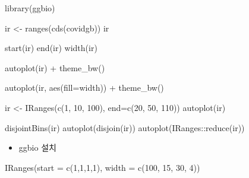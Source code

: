 \documentclass[
]{book}
\newenvironment{Shaded}{\begin{snugshade}}{\end{snugshade}}
\newcommand{\AttributeTok}[1]{\textcolor[rgb]{0.77,0.63,0.00}{#1}}
\newcommand{\DecValTok}[1]{\textcolor[rgb]{0.00,0.00,0.81}{#1}}
\newcommand{\FunctionTok}[1]{\textcolor[rgb]{0.00,0.00,0.00}{#1}}
\newcommand{\NormalTok}[1]{#1}
\newcommand{\OtherTok}[1]{\textcolor[rgb]{0.56,0.35,0.01}{#1}}
\newcommand{\SpecialCharTok}[1]{\textcolor[rgb]{0.00,0.00,0.00}{#1}}
\providecommand{\tightlist}{%
  \setlength{\itemsep}{0pt}\setlength{\parskip}{0pt}}
\begin{document}
\begin{Shaded}
\begin{Highlighting}[]
\FunctionTok{library}\NormalTok{(ggbio)}

\NormalTok{ir }\OtherTok{\textless{}{-}} \FunctionTok{ranges}\NormalTok{(}\FunctionTok{cds}\NormalTok{(covidgb))}
\NormalTok{ir}

\FunctionTok{start}\NormalTok{(ir)}
\FunctionTok{end}\NormalTok{(ir)}
\FunctionTok{width}\NormalTok{(ir)}

\FunctionTok{autoplot}\NormalTok{(ir) }\SpecialCharTok{+}
  \FunctionTok{theme\_bw}\NormalTok{()}

\FunctionTok{autoplot}\NormalTok{(ir, }\FunctionTok{aes}\NormalTok{(}\AttributeTok{fill=}\NormalTok{width)) }\SpecialCharTok{+}
  \FunctionTok{theme\_bw}\NormalTok{()}




\NormalTok{ir }\OtherTok{\textless{}{-}} \FunctionTok{IRanges}\NormalTok{(}\FunctionTok{c}\NormalTok{(}\DecValTok{1}\NormalTok{, }\DecValTok{10}\NormalTok{, }\DecValTok{100}\NormalTok{), }\AttributeTok{end=}\FunctionTok{c}\NormalTok{(}\DecValTok{20}\NormalTok{, }\DecValTok{50}\NormalTok{, }\DecValTok{110}\NormalTok{))}
\FunctionTok{autoplot}\NormalTok{(ir)}


\FunctionTok{disjointBins}\NormalTok{(ir)}
\FunctionTok{autoplot}\NormalTok{(}\FunctionTok{disjoin}\NormalTok{(ir))}
\FunctionTok{autoplot}\NormalTok{(IRanges}\SpecialCharTok{::}\FunctionTok{reduce}\NormalTok{(ir))}
\end{Highlighting}
\end{Shaded}

\begin{itemize}
\tightlist
\item
  ggbio 설치
\end{itemize}

\begin{Shaded}
\begin{Highlighting}[]

\FunctionTok{IRanges}\NormalTok{(}\AttributeTok{start =} \FunctionTok{c}\NormalTok{(}\DecValTok{1}\NormalTok{,}\DecValTok{1}\NormalTok{,}\DecValTok{1}\NormalTok{,}\DecValTok{1}\NormalTok{), }\AttributeTok{width =} \FunctionTok{c}\NormalTok{(}\DecValTok{100}\NormalTok{, }\DecValTok{15}\NormalTok{, }\DecValTok{30}\NormalTok{, }\DecValTok{4}\NormalTok{))}
\end{Highlighting}
\end{Shaded}
\end{document}
